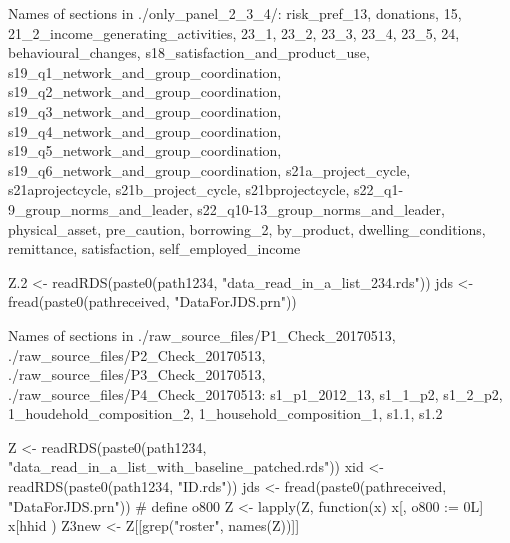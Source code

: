 Names of sections in \textsf{\footnotesize ./only\_panel\_2\_3\_4/}: \textsf{\footnotesize risk\_pref\_13, donations, 15, 21\_2\_income\_generating\_activities, 23\_1, 23\_2, 23\_3, 23\_4, 23\_5, 24, behavioural\_changes, s18\_satisfaction\_and\_product\_use, s19\_q1\_network\_and\_group\_coordination, s19\_q2\_network\_and\_group\_coordination, s19\_q3\_network\_and\_group\_coordination, s19\_q4\_network\_and\_group\_coordination, s19\_q5\_network\_and\_group\_coordination, s19\_q6\_network\_and\_group\_coordination, s21a\_project\_cycle, s21aprojectcycle, s21b\_project\_cycle, s21bprojectcycle, s22\_q1-9\_group\_norms\_and\_leader, s22\_q10-13\_group\_norms\_and\_leader, physical\_asset, pre\_caution, borrowing\_2, by\_product, dwelling\_conditions, remittance, satisfaction, self\_employed\_income}
\begin{Schunk}
\begin{Sinput}
Z.2 <- readRDS(paste0(path1234, "data_read_in_a_list_234.rds"))
jds <- fread(paste0(pathreceived, "DataForJDS.prn"))
\end{Sinput}
\end{Schunk}


Names of sections in \textsf{\footnotesize ./raw\_source\_files/P1\_Check\_20170513, ./raw\_source\_files/P2\_Check\_20170513, ./raw\_source\_files/P3\_Check\_20170513, ./raw\_source\_files/P4\_Check\_20170513}: \textsf{\footnotesize s1\_p1\_2012\_13, s1\_1\_p2, s1\_2\_p2, 1\_houdehold\_composition\_2, 1\_household\_composition\_1, s1.1, s1.2}
\begin{Schunk}
\begin{Sinput}
Z <- readRDS(paste0(path1234, "data_read_in_a_list_with_baseline_patched.rds"))
xid <- readRDS(paste0(path1234, "ID.rds"))
jds <- fread(paste0(pathreceived, "DataForJDS.prn"))
# define o800
Z <- lapply(Z, function(x) {
  x[, o800 := 0L]
  x[hhid %in% jds[grepl("trea", treat), hhid], o800 := 1L]
  })
Z3new <- Z[[grep("roster", names(Z))]]
\end{Sinput}
\end{Schunk}

